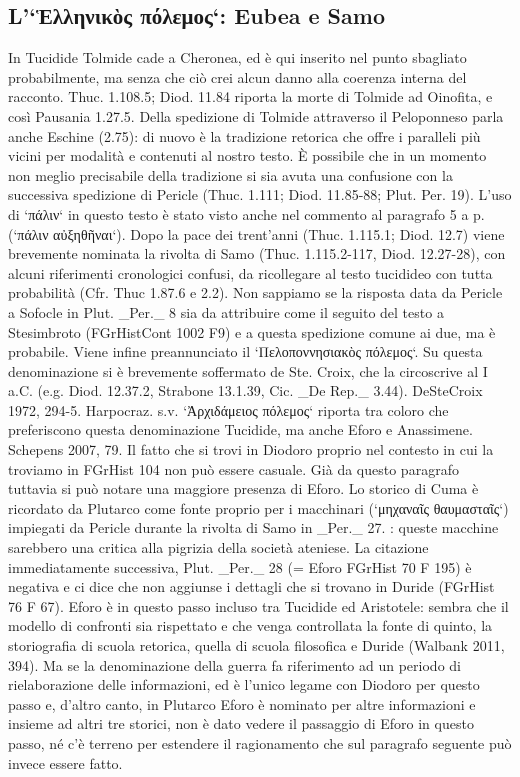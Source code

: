 {            \subsection*{L'`Ἑλληνικὸς πόλεμος`: Eubea e Samo}
            In Tucidide Tolmide cade a Cheronea, ed è qui inserito nel punto sbagliato probabilmente, ma senza che ciò crei alcun danno alla coerenza interna del racconto. Thuc. 1.108.5; Diod. 11.84 riporta la morte di Tolmide ad Oinofita, e così Pausania 1.27.5. Della spedizione di Tolmide attraverso il Peloponneso parla anche Eschine (2.75): di nuovo è la tradizione retorica che offre i paralleli più vicini per modalità e contenuti al nostro testo. È possibile che in un momento non meglio precisabile della tradizione si sia avuta una confusione con la successiva spedizione di Pericle  (Thuc. 1.111; Diod. 11.85-88; Plut. Per. 19).
            L'uso di `πάλιν` in questo testo è stato visto anche nel commento al paragrafo 5 a p. (`πάλιν αὐξηθῆναι`). Dopo la pace dei trent'anni (Thuc. 1.115.1; Diod. 12.7) viene brevemente nominata la rivolta di Samo (Thuc. 1.115.2-117, Diod. 12.27-28), con alcuni riferimenti cronologici confusi, da ricollegare al testo tucidideo con tutta probabilità (Cfr. Thuc 1.87.6 e 2.2). Non sappiamo se la risposta data da Pericle  a Sofocle in Plut. _Per._ 8 sia da attribuire come il seguito del testo a Stesimbroto (FGrHistCont 1002 F9) e a questa spedizione comune ai due, ma è probabile.
            Viene infine preannunciato il `Πελοποννησιακὸς πόλεμος`. Su questa denominazione si è brevemente soffermato de Ste. Croix, che la circoscrive al I a.C. (e.g. Diod. 12.37.2, Strabone 13.1.39, Cic. _De Rep._ 3.44). DeSteCroix 1972, 294-5. Harpocraz. s.v. `Ἀρχιδάμειος πόλεμος` riporta tra coloro che preferiscono questa denominazione Tucidide, ma anche Eforo e Anassimene. Schepens 2007, 79. Il fatto che si trovi in  Diodoro proprio nel contesto in cui la troviamo in FGrHist 104 non può essere casuale. Già da questo paragrafo tuttavia si può notare una maggiore presenza di Eforo. Lo storico di Cuma è ricordato da Plutarco come fonte proprio per i macchinari (`μηχαναῖς θαυμασταῖς`) impiegati da Pericle  durante la rivolta di Samo in _Per._ 27. \cite[420, n. 116 e 426]{Parmeggiani2011}: queste macchine sarebbero una critica alla pigrizia della società ateniese. La citazione immediatamente successiva, Plut. _Per._ 28 (= Eforo FGrHist 70 F 195) è negativa e ci dice che non aggiunse i dettagli che si trovano in Duride (FGrHist 76 F 67). Eforo è in questo passo incluso tra Tucidide ed Aristotele: sembra che il modello di confronti sia rispettato e che venga controllata la fonte di quinto, la storiografia di scuola retorica, quella di scuola filosofica e Duride (Walbank 2011, 394). Ma se la denominazione della guerra fa riferimento ad un periodo di rielaborazione delle informazioni, ed è l'unico legame con  Diodoro per questo passo e, d'altro canto, in Plutarco Eforo è nominato per altre informazioni e insieme ad altri tre storici, non è dato vedere il passaggio di Eforo in questo passo, né c'è terreno per estendere il ragionamento che sul paragrafo seguente può invece essere fatto.     
            
}
